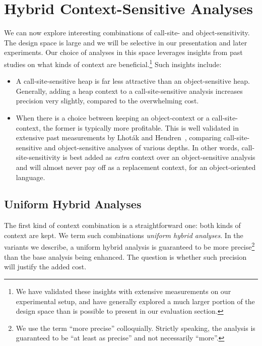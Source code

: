 \section{Hybrid Context-Sensitive Analyses}
\label{sec:hybrid:main}

We can now explore interesting combinations of call-site- and object-sensitivity. The design space is large and we will be selective in our presentation and later experiments. Our choice of analyses in this space leverages insights from past studies on what kinds of context are beneficial.\footnote{We have validated these insights with extensive measurements on our experimental setup, and have generally explored a much larger portion of the design space than is possible to present in our evaluation section.} Such insights include:

\begin{itemize}
\item A call-site-sensitive heap is far less attractive than an object-sensitive heap. Generally, adding a heap context to a call-site-sensitive analysis increases precision very slightly, compared to the overwhelming cost.

\item When there is a choice between keeping an object-context or a call-site-context, the former is typically more profitable. This is well validated in extensive past measurements by Lhot\'{a}k and Hendren~\cite{article:2008:tosem:Lhotak}, comparing call-site-sensitive and object-sensitive analyses of various depths. In other words, call-site-sensitivity is best added as \emph{extra} context over an object-sensitive analysis and will almost never pay off as a replacement context, for an object-oriented language.
\end{itemize}


\subsection{Uniform Hybrid Analyses}

The first kind of context combination is a straightforward one: both kinds of context are kept. We term such combinations \emph{uniform hybrid analyses}. In the variants we describe, a uniform hybrid analysis is guaranteed to be more precise\footnote{We use the term ``more precise'' colloquially. Strictly speaking, the analysis is guaranteed to be ``at least as precise'' and not necessarily ``more''.} than the base analysis being enhanced. The question is whether such precision will justify the added cost.

